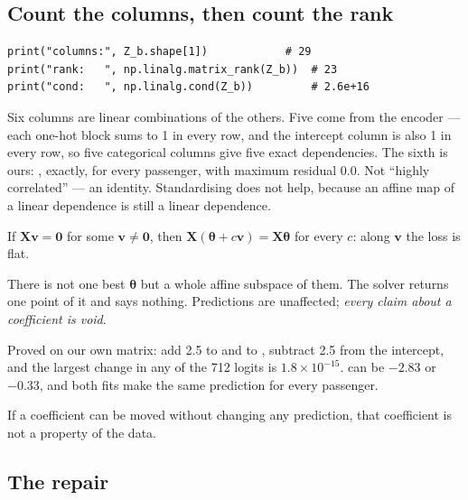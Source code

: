 \documentclass[11pt,a4paper]{article}
\begin{document}
\subsection{Count the columns, then count the rank}

\begin{center}
\small
\begin{verbatim}
print("columns:", Z_b.shape[1])            # 29
print("rank:   ", np.linalg.matrix_rank(Z_b))  # 23
print("cond:   ", np.linalg.cond(Z_b))         # 2.6e+16
\end{verbatim}
\end{center}

Six columns are linear combinations of the others. Five come from the encoder
--- each one-hot block sums to 1 in every row, and the intercept column is also
1 in every row, so five categorical columns give five exact dependencies. The
sixth is ours: , exactly, for every
passenger, with maximum residual $0.0$. Not ``highly correlated'' --- an
identity. Standardising does not help, because an affine map of a linear
dependence is still a linear dependence.

\begin{failbox}[title={Failure condition --- what a rank-deficient design does to the fit}]
If $\mathbf{X}\mathbf{v} = \mathbf{0}$ for some $\mathbf{v} \neq \mathbf{0}$,
then $\mathbf{X}(\boldsymbol\theta + c\mathbf{v}) = \mathbf{X}
\boldsymbol\theta$ for every $c$: along $\mathbf{v}$ the loss is flat.

There is not one best $\boldsymbol\theta$ but a whole affine subspace of them.
The solver returns one point of it and says nothing. Predictions are
unaffected; \emph{every claim about a coefficient is void}.
\end{failbox}

Proved on our own matrix: add 2.5 to  and to
, subtract 2.5 from the intercept, and the largest change in
any of the 712 logits is $1.8\times10^{-15}$.  can be $-2.83$
or $-0.33$, and both fits make the same prediction for every passenger.

\begin{keybox}[title={The test, stated generally}]
If a coefficient can be moved without changing any prediction, that coefficient
is not a property of the data.
\end{keybox}

\subsection{The repair}
\end{document}
